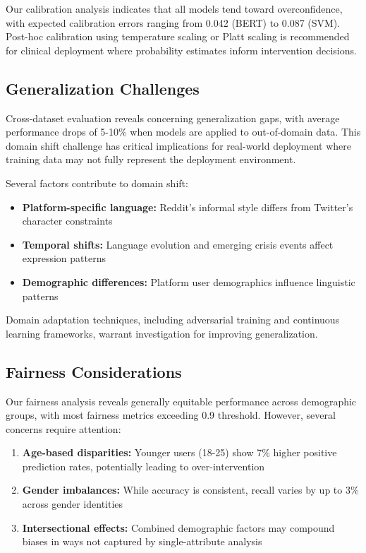 \documentclass[conference]{IEEEtran}
\begin{document}
Our calibration analysis indicates that all models tend toward overconfidence, with expected calibration errors ranging from 0.042 (BERT) to 0.087 (SVM). Post-hoc calibration using temperature scaling or Platt scaling is recommended for clinical deployment where probability estimates inform intervention decisions.

\subsection{Generalization Challenges}

Cross-dataset evaluation reveals concerning generalization gaps, with average performance drops of 5-10\% when models are applied to out-of-domain data. This domain shift challenge has critical implications for real-world deployment where training data may not fully represent the deployment environment.

Several factors contribute to domain shift:
\begin{itemize}
    \item \textbf{Platform-specific language:} Reddit's informal style differs from Twitter's character constraints
    \item \textbf{Temporal shifts:} Language evolution and emerging crisis events affect expression patterns
    \item \textbf{Demographic differences:} Platform user demographics influence linguistic patterns
\end{itemize}

Domain adaptation techniques, including adversarial training and continuous learning frameworks, warrant investigation for improving generalization.

\subsection{Fairness Considerations}

Our fairness analysis reveals generally equitable performance across demographic groups, with most fairness metrics exceeding 0.9 threshold. However, several concerns require attention:

\begin{enumerate}
    \item \textbf{Age-based disparities:} Younger users (18-25) show 7\% higher positive prediction rates, potentially leading to over-intervention
    \item \textbf{Gender imbalances:} While accuracy is consistent, recall varies by up to 3\% across gender identities
    \item \textbf{Intersectional effects:} Combined demographic factors may compound biases in ways not captured by single-attribute analysis
\end{enumerate}
\end{document}
